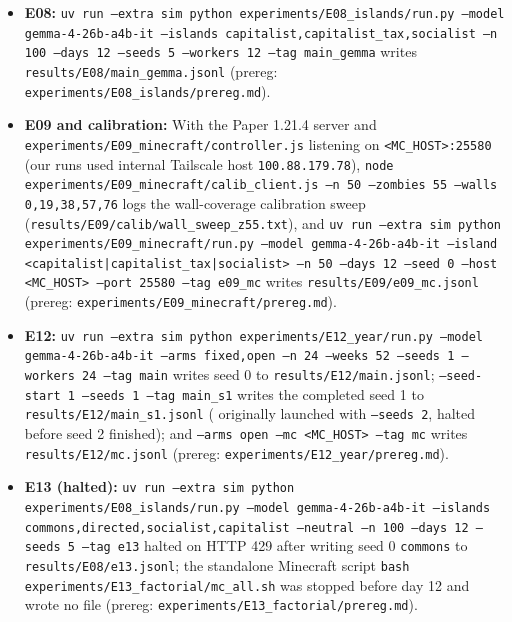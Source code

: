 \documentclass[10pt,letterpaper]{article}
\begin{document}
\begin{itemize}[leftmargin=1.5em]
  \item \textbf{E08:} \texttt{uv run --extra sim python experiments/E08\_islands/run.py --model gemma-4-26b-a4b-it --islands capitalist,capitalist\_tax,socialist --n 100 --days 12 --seeds 5 --workers 12 --tag main\_gemma} writes \texttt{results/E08/main\_gemma.jsonl} (prereg: \texttt{experiments/E08\_islands/prereg.md}).
  \item \textbf{E09 and calibration:} With the Paper 1.21.4 server and \texttt{experiments/E09\_minecraft/controller.js} listening on \texttt{<MC\_HOST>:25580} (our runs used internal Tailscale host \texttt{100.88.179.78}), \texttt{node experiments/E09\_minecraft/calib\_client.js --n 50 --zombies 55 --walls 0,19,38,57,76} logs the wall-coverage calibration sweep (\texttt{results/E09/calib/wall\_sweep\_z55.txt}), and \texttt{uv run --extra sim python experiments/E09\_minecraft/run.py --model gemma-4-26b-a4b-it --island <capitalist|capitalist\_tax|socialist> --n 50 --days 12 --seed 0 --host <MC\_HOST> --port 25580 --tag e09\_mc} writes \texttt{results/E09/e09\_mc.jsonl} (prereg: \texttt{experiments/E09\_minecraft/prereg.md}).
  \item \textbf{E12:} \texttt{uv run --extra sim python experiments/E12\_year/run.py --model gemma-4-26b-a4b-it --arms fixed,open --n 24 --weeks 52 --seeds 1 --workers 24 --tag main} writes seed 0 to \texttt{results/E12/main.jsonl}; \texttt{--seed-start 1 --seeds 1 --tag main\_s1} writes the completed seed 1 to \texttt{results/E12/main\_s1.jsonl} ( originally launched with \texttt{--seeds 2}, halted before seed 2 finished); and \texttt{--arms open --mc <MC\_HOST> --tag mc} writes \texttt{results/E12/mc.jsonl} (prereg: \texttt{experiments/E12\_year/prereg.md}).
  \item \textbf{E13 (halted):} \texttt{uv run --extra sim python experiments/E08\_islands/run.py --model gemma-4-26b-a4b-it --islands commons,directed,socialist,capitalist --neutral --n 100 --days 12 --seeds 5 --tag e13} halted on HTTP 429 after writing seed 0 \texttt{commons} to \texttt{results/E08/e13.jsonl}; the standalone Minecraft script \texttt{bash experiments/E13\_factorial/mc\_all.sh} was stopped before day 12 and wrote no file (prereg: \texttt{experiments/E13\_factorial/prereg.md}).

\end{itemize}
\end{document}
